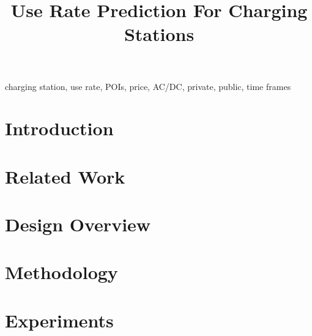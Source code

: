 \documentclass[conference]{IEEEtran}
\begin{document}
\title{Use Rate Prediction For Charging Stations\\}

\author{
\and
{}
}

\maketitle

\begin{abstract}

\end{abstract}

\begin{IEEEkeywords}
charging station, use rate, POIs, price, AC/DC, private, public, time frames
\end{IEEEkeywords}

\section{Introduction}


\section{Related Work}


\section{Design Overview}


\section{Methodology}


\section{Experiments}

\end{document}
